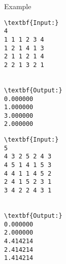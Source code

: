 Example
\begin{verbatim}
\textbf{Input:}
4
1 1 1 2 3 4
1 2 1 4 1 3
2 1 1 2 1 4
2 2 1 3 2 1


\textbf{Output:}
0.000000
1.000000
3.000000
2.000000

\end{verbatim}
\begin{verbatim}
\textbf{Input:}
5
4 3 2 5 2 4 3
4 5 1 4 1 5 3
4 4 1 1 4 5 2
2 4 1 5 2 3 1
3 4 2 2 4 3 1


\textbf{Output:}
0.000000
2.000000
4.414214
2.414214
1.414214

\end{verbatim}